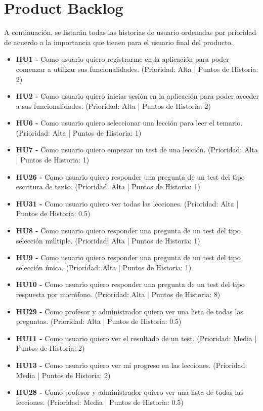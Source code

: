\section{Product Backlog}
A continuación, se listarán todas las historias de usuario ordenadas por prioridad de acuerdo a la importancia que tienen para el usuario final del producto.
\begin{itemize}
    \item \textbf{HU1 - } Como usuario quiero registrarme en la aplicación para poder comenzar a utilizar sus funcionalidades. (Prioridad: Alta | Puntos de Historia: 2)
    \item \textbf{HU2 - } Como usuario quiero iniciar sesión en la aplicación para poder acceder a sus funcionalidades. (Prioridad: Alta | Puntos de Historia: 2)
    \item \textbf{HU6 - } Como usuario quiero seleccionar una lección para leer el temario. (Prioridad: Alta | Puntos de Historia: 1)
    \item \textbf{HU7 - } Como usuario quiero empezar un test de una lección. (Prioridad: Alta | Puntos de Historia: 1)
    \item \textbf{HU26 - } Como usuario quiero responder una pregunta de un test del tipo escritura de texto. (Prioridad: Alta | Puntos de Historia: 1)
    \item \textbf{HU31 - } Como usuario quiero ver todas las lecciones. (Prioridad: Alta | Puntos de Historia: 0.5)
    \item \textbf{HU8 - } Como usuario quiero responder una pregunta de un test del tipo selección múltiple. (Prioridad: Alta | Puntos de Historia: 1)
    \item \textbf{HU9 - } Como usuario quiero responder una pregunta de un test del tipo selección única. (Prioridad: Alta | Puntos de Historia: 1)
    \item \textbf{HU10 - } Como usuario quiero responder una pregunta de un test del tipo respuesta por micrófono. (Prioridad: Alta | Puntos de Historia: 8)
    \item \textbf{HU29 - } Como profesor y administrador quiero ver una lista de todas las preguntas. (Prioridad: Alta | Puntos de Historia: 0.5)
    \item \textbf{HU11 - } Como usuario quiero ver el resultado de un test. (Prioridad: Media | Puntos de Historia: 2)
    \item \textbf{HU13 - } Como usuario quiero ver mi progreso en las lecciones. (Prioridad: Media | Puntos de Historia: 2)
    \item \textbf{HU28 - } Como profesor y administrador quiero ver una lista de todas las lecciones. (Prioridad: Media | Puntos de Historia: 0.5)

\end{itemize}
